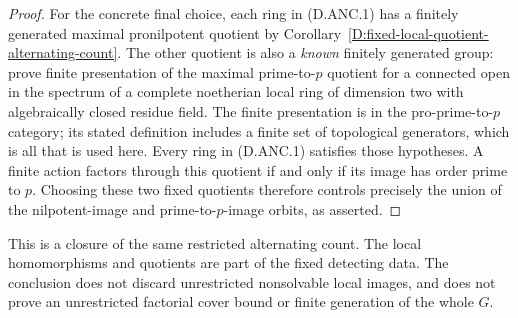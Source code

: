 \begin{proof}
For the concrete final choice, each ring in (D.ANC.1) has a
finitely generated maximal pronilpotent quotient by
Corollary~\ref{D:fixed-local-quotient-alternating-count}. The other
quotient is also a \emph{known} finitely generated group:
\citet[\S9.1 and Theorem~9.2, pp.~122--123]
{C_GrothendieckMurre1971PrimeToP} prove finite presentation of the
maximal prime-to-$p$ quotient for a connected open in the spectrum
of a complete noetherian local ring of dimension two with
algebraically closed residue field. The finite presentation is in
the pro-prime-to-$p$ category; its stated definition includes a
finite set of topological generators, which is all that is used
here. Every ring in (D.ANC.1) satisfies those hypotheses. A finite
action factors through this quotient if and only if its image
has order prime to $p$. Choosing these two fixed quotients
therefore controls precisely the union of the nilpotent-image
and prime-to-$p$-image orbits, as asserted.
\end{proof}

\begin{remark}
This is a closure of the same restricted alternating count.
The local homomorphisms and quotients are part of the fixed
detecting data. The conclusion does not discard unrestricted
nonsolvable local images, and does not prove an unrestricted
factorial cover bound or finite generation of the whole $G$.
\end{remark}
